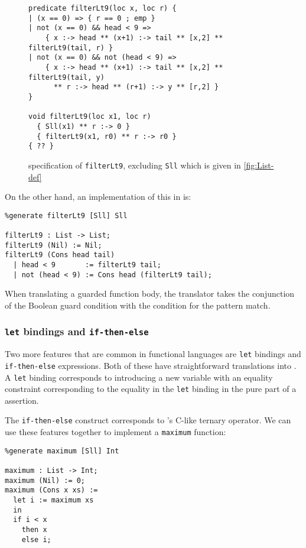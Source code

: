\begin{figure}
  \begin{lstlisting}
predicate filterLt9(loc x, loc r) {
| (x == 0) => { r == 0 ; emp }
| not (x == 0) && head < 9 =>
    { x :-> head ** (x+1) :-> tail ** [x,2] ** filterLt9(tail, r) }
| not (x == 0) && not (head < 9) =>
    { x :-> head ** (x+1) :-> tail ** [x,2] ** filterLt9(tail, y)
      ** r :-> head ** (r+1) :-> y ** [r,2] }
}

void filterLt9(loc x1, loc r)
  { Sll(x1) ** r :-> 0 }
  { filterLt9(x1, r0) ** r :-> r0 }
{ ?? }
  \end{lstlisting}
  \caption{\SuSLik{} specification of \lstinline{filterLt9}, excluding \lstinline{Sll} which is given in \autoref{fig:List-def}}
  \label{fig:suslik-filter}
\end{figure}

On the other hand, an implementation of this in \Pika{} is:

\begin{lstlisting}
%generate filterLt9 [Sll] Sll

filterLt9 : List -> List;
filterLt9 (Nil) := Nil;
filterLt9 (Cons head tail)
  | head < 9       := filterLt9 tail;
  | not (head < 9) := Cons head (filterLt9 tail);
\end{lstlisting}

\noindent
When translating a guarded function body, the translator takes the conjunction of the Boolean guard condition with
the condition for the pattern match.

\subsubsection{\texttt{let} bindings and \texttt{if-then-else}}

Two more features that are common in functional languages are \verb|let| bindings and
\verb|if-then-else| expressions. Both of these have straightforward translations into
\SuSLik. A \verb|let| binding corresponds to introducing a new variable with an equality
constraint corresponding to the equality in the \verb|let| binding in the pure part of a \SuSLik{} assertion.

The \verb|if-then-else| construct corresponds to \SuSLik's C-like ternary operator. We can use these features together to implement a \verb|maximum| function:

\begin{lstlisting}
%generate maximum [Sll] Int

maximum : List -> Int;
maximum (Nil) := 0;
maximum (Cons x xs) :=
  let i := maximum xs
  in
  if i < x
    then x
    else i;
\end{lstlisting}

